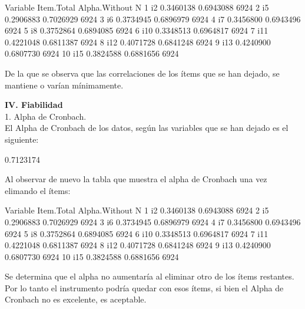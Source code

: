 \documentclass{article}
\begin{document}
\begin{Schunk}
\begin{Soutput}
   Variable Item.Total Alpha.Without    N
1        i2  0.3460138     0.6943088 6924
2        i5  0.2906883     0.7026929 6924
3        i6  0.3734945     0.6896979 6924
4        i7  0.3456800     0.6943496 6924
5        i8  0.3752864     0.6894085 6924
6       i10  0.3348513     0.6964817 6924
7       i11  0.4221048     0.6811387 6924
8       i12  0.4071728     0.6841248 6924
9       i13  0.4240900     0.6807730 6924
10      i15  0.3824588     0.6881656 6924
\end{Soutput}
\end{Schunk}

De la que se observa que las correlaciones de los ítems que se han dejado, se mantiene o varían mínimamente. 

\textbf{IV.	Fiabilidad}\\
1. Alpha de Cronbach.\\
El Alpha de Cronbach de los datos, según las variables que se han dejado es el siguiente: 

\begin{Schunk}
\begin{Soutput}
[1] 0.7123174
\end{Soutput}
\end{Schunk}

Al observar de nuevo la tabla que muestra el alpha de Cronbach una vez elimando el ítems:

\begin{Schunk}
\begin{Soutput}
   Variable Item.Total Alpha.Without    N
1        i2  0.3460138     0.6943088 6924
2        i5  0.2906883     0.7026929 6924
3        i6  0.3734945     0.6896979 6924
4        i7  0.3456800     0.6943496 6924
5        i8  0.3752864     0.6894085 6924
6       i10  0.3348513     0.6964817 6924
7       i11  0.4221048     0.6811387 6924
8       i12  0.4071728     0.6841248 6924
9       i13  0.4240900     0.6807730 6924
10      i15  0.3824588     0.6881656 6924
\end{Soutput}
\end{Schunk}

Se determina que el alpha no aumentaría al eliminar otro de los ítems restantes. Por lo tanto el instrumento podría quedar con esos ítems, si bien el Alpha de Cronbach no es excelente, es aceptable. 
\end{document}
